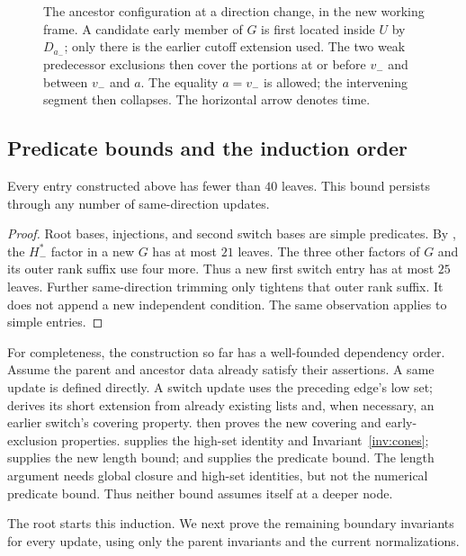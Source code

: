 \begin{figure}[t]
\centering

\caption{The ancestor configuration at a direction change, in the new
working frame. A candidate early member of \(G\) is first located
inside \(U\) by \(D_{a_-}\); only there is the earlier cutoff
extension used. The two weak predecessor exclusions then cover
the portions at or before \(v_-\) and between \(v_-\) and \(a\).
The equality \(a=v_-\) is allowed; the intervening segment then
collapses. The horizontal arrow denotes time.}
\label{fig:switch}
\end{figure}

\subsection{Predicate bounds and the induction order}

\begin{lemma}\label{lem:entry-size}
Every entry constructed above has fewer than \(40\) leaves.
This bound persists through any number of same-direction updates.
\end{lemma}
\begin{proof}
Root bases, injections, and second switch bases are simple predicates.
By , the \(H_-^*\) factor in a new \(G\)
has at most \(21\) leaves. The three other factors of \(G\)
and its outer rank suffix use four more. Thus a new first switch
entry has at most \(25\) leaves.
Further same-direction trimming only tightens that outer rank
suffix. It does not append a new independent condition.
The same observation applies to simple entries.
\end{proof}

For completeness, the construction so far has a well-founded
dependency order. Assume the parent and ancestor data already satisfy
their assertions. A same update is defined directly. A switch update
uses the preceding edge's low set;  derives its
short extension from already existing lists and, when necessary,
an earlier switch's covering property.  then proves
the new covering and early-exclusion properties.
 supplies the high-set identity and
Invariant~\ref{inv:cones};  supplies the new
length bound; and  supplies the predicate bound.
The length argument needs global closure and high-set identities,
but not the numerical predicate bound. Thus neither bound assumes
itself at a deeper node.

The root starts this induction. We next prove the remaining boundary
invariants for every update, using only the parent invariants and
the current normalizations.
